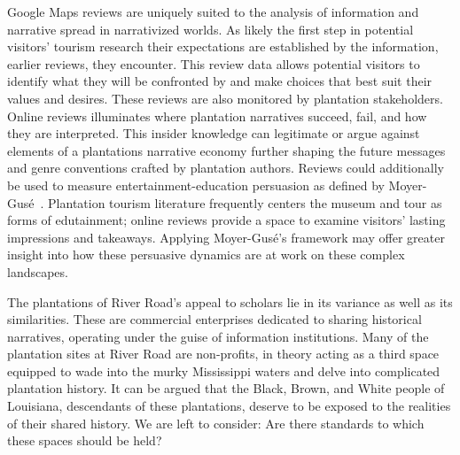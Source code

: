 \documentclass[final]{anthology-ch} %
\begin{document}
Google Maps reviews are uniquely suited to the analysis of information and narrative spread in narrativized worlds. As likely the first step in potential visitors' tourism research their expectations are established by the information, earlier reviews, they encounter. This review data allows potential visitors to identify what they will be confronted by and make choices that best suit their values and desires. These reviews are also monitored by plantation stakeholders. Online reviews illuminates where plantation narratives succeed, fail, and how they are interpreted. This insider knowledge can legitimate or argue against elements of a plantations narrative economy further shaping the future messages and genre conventions crafted by plantation authors. Reviews could additionally be used to measure entertainment-education persuasion as defined by Moyer-Gusé~\cite{moyerguse2008toward}. Plantation tourism literature frequently centers the museum and tour as forms of edutainment; online reviews provide a space to examine visitors' lasting impressions and takeaways. Applying Moyer-Gusé's framework may offer greater insight into how these persuasive dynamics are at work on these complex landscapes.

The plantations of River Road's appeal to scholars lie in its variance as well as its similarities. These are commercial enterprises dedicated to sharing historical narratives, operating under the guise of information institutions. Many of the plantation sites at River Road are non-profits, in theory acting as a third space equipped to wade into the murky Mississippi waters and delve into complicated plantation history. It can be argued that the Black, Brown, and White people of Louisiana, descendants of these plantations, deserve to be exposed to the realities of their shared history. We are left to consider: Are there standards to which these spaces should be held?

\printbibliography
\end{document}

